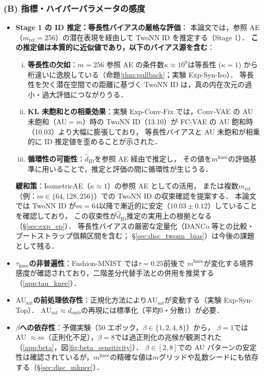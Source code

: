 \documentclass[11pt,a4paper]{jsarticle}
\newcommand{\kap}{\kappa}
\newcommand{\AUsat}{\mathrm{AU}_{\mathrm{sat}}}
\newcommand{\mknee}{m^{\mathrm{knee}}}
\newcommand{\demb}{d_{\mathrm{emb}}}
\begin{document}
\subsubsection*{(B) 指標・ハイパーパラメータの感度}

\begin{itemize}
  \item \textbf{Stage 1 の ID 推定：等長性バイアスの厳格な評価}：
        本論文では，参照 AE（$m_\mathrm{ref}=256$）の潜在表現を経由して TwoNN ID を推定する（Stage 1）．
        \textbf{この推定値は本質的に近似値であり，以下のバイアス源を含む}：
        \begin{enumerate}[(i)]
          \item \textbf{等長性の欠如}：$m=256$ 参照 AE の条件数$\kap \approx 10^9$は等長性
                ($\kap=1$) から桁違いに逸脱している（命題\ref{thm:pullback}；実験 Exp-Syn-Iso）．
                等長性を欠く潜在空間での距離に基づく TwoNN ID は，真の内在次元の過小・過大評価につながりうる．
          \item \textbf{KL 未飽和との相乗効果}：実験 Exp-Conv-Fix では，Conv-VAE の AU 未飽和（AU$=m$）時の
                TwoNN ID（13.10）が FC-VAE の AU 飽和時（10.03）より大幅に膨張しており，
                等長性バイアスと AU 未飽和が相乗的に ID 推定値を歪めることが示された．
          \item \textbf{循環性の可能性}：$\hat{d}_\mathrm{ID}$を参照 AE 経由で推定し，
                その値を$\mknee$の評価基準に用いることで，推定と評価の間に循環性が生じうる．
        \end{enumerate}
        \textbf{緩和策}：IsometricAE（$\kap \approx 1$）の参照 AE としての活用，
        または複数$m_\mathrm{ref}$（例：$m \in \{64, 128, 256\}$）での TwoNN ID の収束確認を提案する．
        本論文では TwoNN ID が$m=64$以降で漸近的に安定（$10.03 \pm 0.12$）していることを確認しており，
        この収束性が$\hat{d}_\mathrm{ID}$推定の実用上の根拠となる（§\ref{sec:exp_ep}）．
        等長性バイアスの厳密な定量化（DANCo 等との比較・ブートストラップ信頼区間を含む；
        §\ref{sec:disc_twonn_bias}）は今後の課題として残る．
  \item \textbf{$\tau_{\mathrm{knee}}$の非普遍性}：Fashion-MNIST では$\tau = 0.25$前後で
        $\mknee$が変化する境界感度が確認されており，二階差分代替手法との併用を推奨する
        （\ref{app:tau_knee}）．
  \item \textbf{$\AUsat$の前処理依存性}：正規化方法により$\AUsat$が変動する（実験 Exp-Syn-Top）．
        $\AUsat \approx \demb$の再現には標準化（平均0・分散1）が必要．
  \item \textbf{$\beta$への依存性}：予備実験（50 エポック，$\beta \in \{1,2,4,8\}$）から，
        $\beta = 1$では AU $\approx m$（正則化不足），$\beta = 8$では過正則化の兆候が観測された
        （\ref{app:beta}，図\ref{fig:beta_sensitivity}）．
        $\beta \in [2, 8]$での AU パターンの安定性は確認されているが，$\mknee$の精確な値は$m$グリッドや乱数シードにも依存する（§\ref{sec:disc_mknee}）．
\end{itemize}
\end{document}
